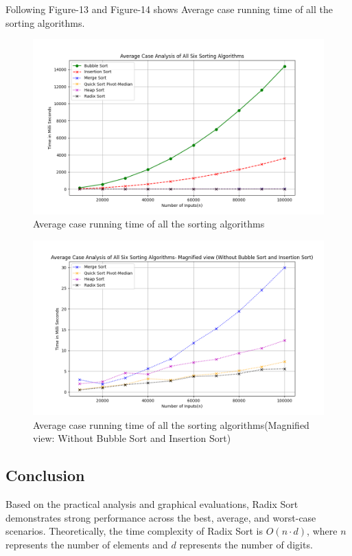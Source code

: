 \documentclass[a4paper,12pt]{report}
\begin{document}
Following Figure-13 and Figure-14 shows Average case running time of all the sorting algorithms. 
\begin{figure}[H]
	\centering
	\includegraphics[width=1.1\textwidth]{./Averageofall.png}
	\caption{Average case running time of all the sorting algorithms}
	\label{fig:Average of all}
\end{figure}

\begin{figure}[H]
	\centering
	\includegraphics[width=1.1\textwidth]{./Averageofallmagnified.png}
	\caption{Average case running time of all the sorting algorithms(Magnified view: Without Bubble Sort and Insertion Sort)}
	\label{fig:Average of all Magnified}
\end{figure}

\subsection{Conclusion}
Based on the practical analysis and graphical evaluations, Radix Sort demonstrates strong performance across the best, average, and worst-case scenarios. Theoretically, the time complexity of Radix Sort is \(O(n \cdot d)\), where \(n\) represents the number of elements and \(d\) represents the number of digits.
\end{document}
